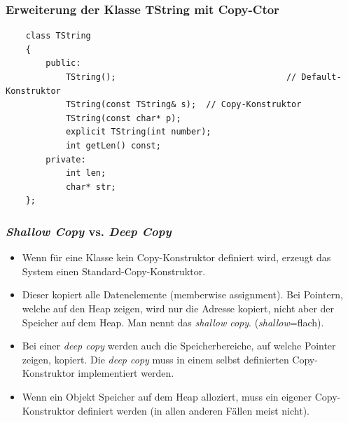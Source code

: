 \subsubsection{Erweiterung der Klasse TString mit Copy-Ctor}
\vspace{-\baselineskip}
\begin{minipage}{0.75\linewidth}
	\begin{lstlisting}
	class TString
	{
		public:
			TString();									// Default-Konstruktor
			TString(const TString& s);	// Copy-Konstruktor
			TString(const char* p);
			explicit TString(int number);
			int getLen() const;
		private:
			int len;
			char* str;
	};
	\end{lstlisting}
\end{minipage}

\subsubsection{\emph{Shallow Copy} vs. \emph{Deep Copy}}
\begin{itemize}
	\item Wenn für eine Klasse kein Copy-Konstruktor definiert wird, erzeugt das System einen Standard-Copy-Konstruktor.
	\item Dieser kopiert alle Datenelemente (memberwise assignment). Bei Pointern, welche auf den Heap zeigen, wird nur die Adresse kopiert, nicht aber der Speicher auf dem Heap. Man nennt das \emph{shallow copy}. (\emph{shallow}=flach).
	\item Bei einer \emph{deep copy} werden auch die Speicherbereiche, auf welche Pointer zeigen, kopiert. Die \emph{deep copy} muss in einem selbst definierten Copy-Konstruktor implementiert werden.
	\item[\-]\begin{hinweis}
		Wenn ein Objekt Speicher auf dem Heap alloziert, muss ein eigener Copy-Konstruktor definiert werden (in allen anderen Fällen meist nicht).
	\end{hinweis}
\end{itemize}
